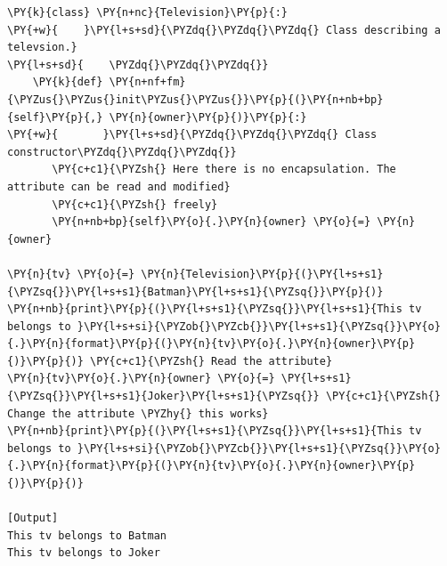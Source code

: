 \begin{Verbatim}[label=\makebox{\url{https://github.com/lucabaldini/cmepda/tree/master/slides/latex/snippets/class\_tv\_encapsulation\_none.py}},commandchars=\\\{\}]
\PY{k}{class} \PY{n+nc}{Television}\PY{p}{:}
\PY{+w}{    }\PY{l+s+sd}{\PYZdq{}\PYZdq{}\PYZdq{} Class describing a televsion.}
\PY{l+s+sd}{    \PYZdq{}\PYZdq{}\PYZdq{}}
    \PY{k}{def} \PY{n+nf+fm}{\PYZus{}\PYZus{}init\PYZus{}\PYZus{}}\PY{p}{(}\PY{n+nb+bp}{self}\PY{p}{,} \PY{n}{owner}\PY{p}{)}\PY{p}{:}
\PY{+w}{       }\PY{l+s+sd}{\PYZdq{}\PYZdq{}\PYZdq{} Class constructor\PYZdq{}\PYZdq{}\PYZdq{}}
       \PY{c+c1}{\PYZsh{} Here there is no encapsulation. The attribute can be read and modified}
       \PY{c+c1}{\PYZsh{} freely}
       \PY{n+nb+bp}{self}\PY{o}{.}\PY{n}{owner} \PY{o}{=} \PY{n}{owner}
       
\PY{n}{tv} \PY{o}{=} \PY{n}{Television}\PY{p}{(}\PY{l+s+s1}{\PYZsq{}}\PY{l+s+s1}{Batman}\PY{l+s+s1}{\PYZsq{}}\PY{p}{)}
\PY{n+nb}{print}\PY{p}{(}\PY{l+s+s1}{\PYZsq{}}\PY{l+s+s1}{This tv belongs to }\PY{l+s+si}{\PYZob{}\PYZcb{}}\PY{l+s+s1}{\PYZsq{}}\PY{o}{.}\PY{n}{format}\PY{p}{(}\PY{n}{tv}\PY{o}{.}\PY{n}{owner}\PY{p}{)}\PY{p}{)} \PY{c+c1}{\PYZsh{} Read the attribute}
\PY{n}{tv}\PY{o}{.}\PY{n}{owner} \PY{o}{=} \PY{l+s+s1}{\PYZsq{}}\PY{l+s+s1}{Joker}\PY{l+s+s1}{\PYZsq{}} \PY{c+c1}{\PYZsh{} Change the attribute \PYZhy{} this works}
\PY{n+nb}{print}\PY{p}{(}\PY{l+s+s1}{\PYZsq{}}\PY{l+s+s1}{This tv belongs to }\PY{l+s+si}{\PYZob{}\PYZcb{}}\PY{l+s+s1}{\PYZsq{}}\PY{o}{.}\PY{n}{format}\PY{p}{(}\PY{n}{tv}\PY{o}{.}\PY{n}{owner}\PY{p}{)}\PY{p}{)}

[Output]
This tv belongs to Batman
This tv belongs to Joker
\end{Verbatim}